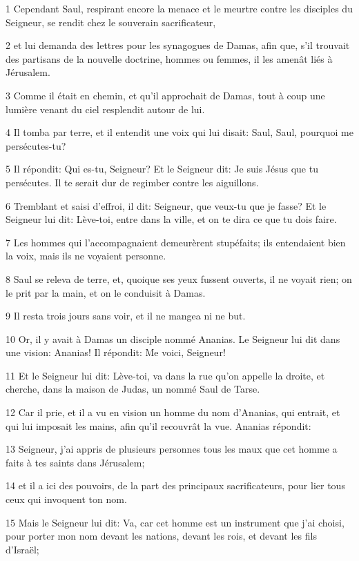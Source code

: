 \par 1 Cependant Saul, respirant encore la menace et le meurtre contre les disciples du Seigneur, se rendit chez le souverain sacrificateur,
\par 2 et lui demanda des lettres pour les synagogues de Damas, afin que, s'il trouvait des partisans de la nouvelle doctrine, hommes ou femmes, il les amenât liés à Jérusalem.
\par 3 Comme il était en chemin, et qu'il approchait de Damas, tout à coup une lumière venant du ciel resplendit autour de lui.
\par 4 Il tomba par terre, et il entendit une voix qui lui disait: Saul, Saul, pourquoi me persécutes-tu?
\par 5 Il répondit: Qui es-tu, Seigneur? Et le Seigneur dit: Je suis Jésus que tu persécutes. Il te serait dur de regimber contre les aiguillons.
\par 6 Tremblant et saisi d'effroi, il dit: Seigneur, que veux-tu que je fasse? Et le Seigneur lui dit: Lève-toi, entre dans la ville, et on te dira ce que tu dois faire.
\par 7 Les hommes qui l'accompagnaient demeurèrent stupéfaits; ils entendaient bien la voix, mais ils ne voyaient personne.
\par 8 Saul se releva de terre, et, quoique ses yeux fussent ouverts, il ne voyait rien; on le prit par la main, et on le conduisit à Damas.
\par 9 Il resta trois jours sans voir, et il ne mangea ni ne but.
\par 10 Or, il y avait à Damas un disciple nommé Ananias. Le Seigneur lui dit dans une vision: Ananias! Il répondit: Me voici, Seigneur!
\par 11 Et le Seigneur lui dit: Lève-toi, va dans la rue qu'on appelle la droite, et cherche, dans la maison de Judas, un nommé Saul de Tarse.
\par 12 Car il prie, et il a vu en vision un homme du nom d'Ananias, qui entrait, et qui lui imposait les mains, afin qu'il recouvrât la vue. Ananias répondit:
\par 13 Seigneur, j'ai appris de plusieurs personnes tous les maux que cet homme a faits à tes saints dans Jérusalem;
\par 14 et il a ici des pouvoirs, de la part des principaux sacrificateurs, pour lier tous ceux qui invoquent ton nom.
\par 15 Mais le Seigneur lui dit: Va, car cet homme est un instrument que j'ai choisi, pour porter mon nom devant les nations, devant les rois, et devant les fils d'Israël;
